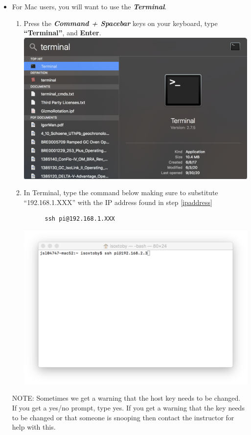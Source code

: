 \documentclass{article}
\begin{document}
\begin{itemize}
\begin{enumerate}
    \end{enumerate}
    \item For Mac users, you will want to use the \textbf{\textit{Terminal}}.
    \begin{enumerate}
      \item Press the \textbf{\textit{Command + Spacebar}} keys on your keyboard, type \textbf{``Terminal''}, and \textbf{Enter}.
  \newline
  \includegraphics[width=1.00\textwidth]{searchterm}
  \newline
      \item In Terminal, type the command below making sure to substitute ``192.168.1.XXX'' with the IP address found in step \ref{ipaddress}
      \begin{lstlisting}
      ssh pi@192.168.1.XXX 
      \end{lstlisting}
  \includegraphics[width=1.00\textwidth]{termssh}
    \end{enumerate}
    
NOTE: Sometimes we get a warning that the host key needs to be changed. If you get a yes/no prompt, type yes. If you get a warning that the key needs to be changed or that someone is snooping then contact the instructor for help with this.  
\end{itemize}
\end{document}

